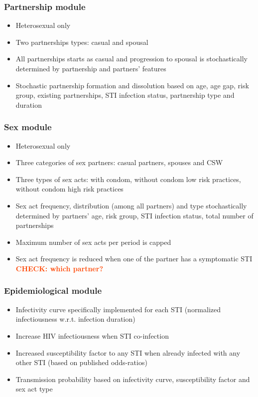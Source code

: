 \documentclass[11pt, onecolumn]{article}
\newcommand{\warning}[1]{\textbf{\textcolor{OrangeRed}{#1}}}
\begin{document}
\begin{footnotesize}
\subsubsection*{Partnership module}
\begin{itemize}
\item Heterosexual only
\item Two partnerships types: casual and spousal
\item All partnerships starts as casual and progression to spousal is stochastically determined by partnership and partners' features
\item Stochastic partnership formation and dissolution based on age, age gap, risk group, existing partnerships, STI infection status, partnership type and duration
\end{itemize}

\subsubsection*{Sex module}
\begin{itemize}
\item Heterosexual only
\item Three categories of sex partners: casual partners, spouses and CSW
\item Three types of sex acts: with condom, without condom low risk practices, without condom high risk practices
\item Sex act frequency, distribution (among all partners) and type stochastically determined by partners' age, risk group, STI infection status, total number of partnerships
\item Maximum number of sex acts per period is capped 
\item Sex act frequency is reduced when one of the partner has a symptomatic STI \warning{CHECK: which partner?}
\end{itemize}

\subsubsection*{Epidemiological module}
\begin{itemize}
\item Infectivity curve specifically implemented for each STI (normalized infectiousness w.r.t. infection duration)
\item Increase HIV infectiousness when STI co-infection
\item Increased susceptibility factor to any STI when already infected with any other STI (based on published odds-ratios)
\item Transmission probability based on infectivity curve, susceptibility factor and sex act type
\end{itemize}


\end{footnotesize}
\end{document}
